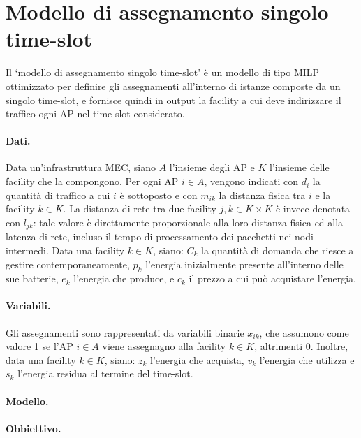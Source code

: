 %
%
\section{Modello di assegnamento singolo time-slot}
\label{sec:modello-migrazioni-0}

Il `modello di assegnamento singolo time-slot' è un modello di tipo MILP ottimizzato per definire gli assegnamenti all'interno di istanze composte da un singolo time-slot, e fornisce quindi in output la facility a cui deve indirizzare il traffico ogni AP nel time-slot considerato.

\paragraph*{Dati.}

Data un'infrastruttura MEC, siano $A$ l'insieme degli AP e $K$ l'insieme delle facility che la compongono. Per ogni AP $i \in A$, vengono indicati con $d_i$ la quantità di traffico a cui $i$ è sottoposto e con $m_{ik}$ la distanza fisica tra $i$ e la facility $k \in K$. La distanza di rete tra due facility $j, k \in K \times K$ è invece denotata con $l_{jk}$: tale valore è direttamente proporzionale alla loro distanza fisica ed alla latenza di rete, incluso il tempo di processamento dei pacchetti nei nodi intermedi. Data una facility $k \in K$, siano: $C_k$ la quantità di domanda che riesce a gestire contemporaneamente, $p_k$ l'energia inizialmente presente all'interno delle sue batterie, $e_k$ l'energia che produce, e $c_k$ il prezzo a cui può acquistare l'energia.

\paragraph*{Variabili.}

Gli assegnamenti sono rappresentati da variabili binarie $x_{ik}$, che assumono come valore 1 se l'AP $i \in A$ viene assegnagno alla facility $k \in K$, altrimenti 0. Inoltre, data una facility $k \in K$, siano: $z_k$ l'energia che acquista, $v_k$ l'energia che utilizza e $s_k$ l'energia residua al termine del time-slot.

\paragraph*{Modello.}



\paragraph*{Obbiettivo.}


